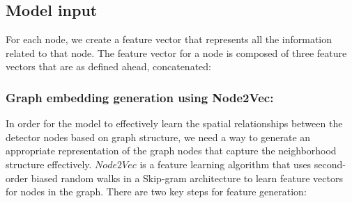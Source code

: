 \subsection{\textbf{Model input}}

For each node, we create a feature vector that represents all the information related to that node. The feature vector for a node is composed of three feature vectors that are as defined ahead, concatenated:

\subsubsection{Graph embedding generation using Node2Vec:}

In order for the model to effectively learn the spatial relationships between the detector nodes based on graph structure, we need a way to generate an appropriate representation of the graph nodes that capture the neighborhood structure effectively. $Node2Vec$\cite{node2vec} is a feature learning algorithm that uses second-order biased random walks in a Skip-gram architecture to learn feature vectors for nodes in the graph. There are two key steps for feature generation:

